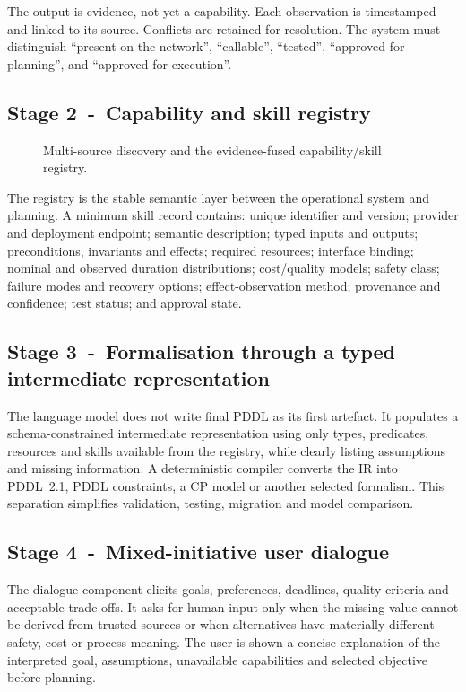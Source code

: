 \documentclass{plan4ari_report}
\begin{document}
The output is evidence, not yet a capability. Each observation is timestamped and linked to its source. Conflicts are retained for resolution. The system must distinguish ``present on the network'', ``callable'', ``tested'', ``approved for planning'', and ``approved for execution''.

\subsection{Stage 2~-~Capability and skill registry}\label{sec:registry}
\begin{figure}[htbp]
  
\caption{Multi-source discovery and the evidence-fused capability/skill registry.}\label{fig:registry}
\end{figure}

The registry is the stable semantic layer between the operational system and planning. A minimum skill record contains: unique identifier and version; provider and deployment endpoint; semantic description; typed inputs and outputs; preconditions, invariants and effects; required resources; interface binding; nominal and observed duration distributions; cost/quality models; safety class; failure modes and recovery options; effect-observation method; provenance and confidence; test status; and approval state.

\subsection{Stage 3~-~Formalisation through a typed intermediate representation}
The language model does not write final PDDL as its first artefact. It populates a schema-constrained intermediate representation using only types, predicates, resources and skills available from the registry, while clearly listing assumptions and missing information. A deterministic compiler converts the IR into PDDL~2.1, PDDL constraints, a CP model or another selected formalism. This separation simplifies validation, testing, migration and model comparison.

\subsection{Stage 4~-~Mixed-initiative user dialogue}
The dialogue component elicits goals, preferences, deadlines, quality criteria and acceptable trade-offs. It asks for human input only when the missing value cannot be derived from trusted sources or when alternatives have materially different safety, cost or process meaning. The user is shown a concise explanation of the interpreted goal, assumptions, unavailable capabilities and selected objective before planning.
\end{document}
